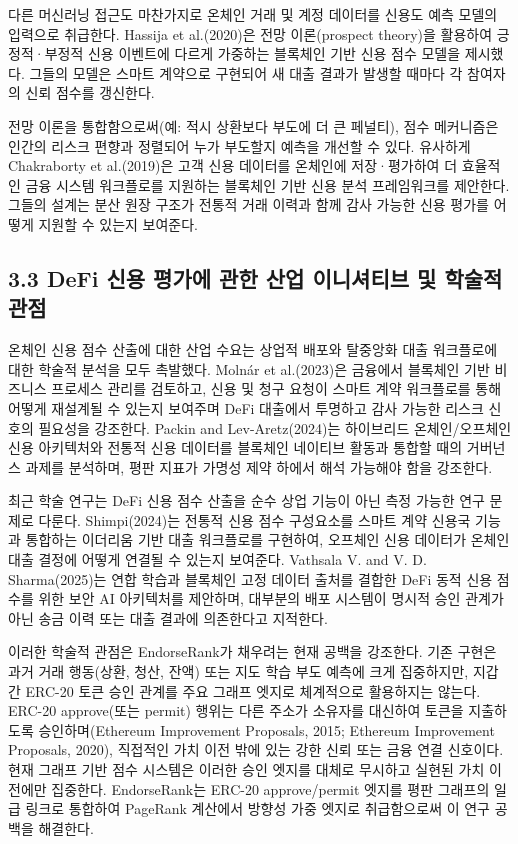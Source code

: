 다른 머신러닝 접근도 마찬가지로 온체인 거래 및 계정 데이터를 신용도 예측 모델의 입력으로 취급한다. Hassija et al.(2020)은 전망 이론(prospect theory)을 활용하여 긍정적·부정적 신용 이벤트에 다르게 가중하는 블록체인 기반 신용 점수 모델을 제시했다. 그들의 모델은 스마트 계약으로 구현되어 새 대출 결과가 발생할 때마다 각 참여자의 신뢰 점수를 갱신한다.


전망 이론을 통합함으로써(예: 적시 상환보다 부도에 더 큰 페널티), 점수 메커니즘은 인간의 리스크 편향과 정렬되어 누가 부도할지 예측을 개선할 수 있다. 유사하게 Chakraborty et al.(2019)은 고객 신용 데이터를 온체인에 저장·평가하여 더 효율적인 금융 시스템 워크플로를 지원하는 블록체인 기반 신용 분석 프레임워크를 제안한다. 그들의 설계는 분산 원장 구조가 전통적 거래 이력과 함께 감사 가능한 신용 평가를 어떻게 지원할 수 있는지 보여준다.


\subsection*{3.3 DeFi 신용 평가에 관한 산업 이니셔티브 및 학술적 관점}
\label{sec:industry-initiatives-and-non-scholarly-perspectives}

온체인 신용 점수 산출에 대한 산업 수요는 상업적 배포와 탈중앙화 대출 워크플로에 대한 학술적 분석을 모두 촉발했다. Moln\'{a}r et al.(2023)은 금융에서 블록체인 기반 비즈니스 프로세스 관리를 검토하고, 신용 및 청구 요청이 스마트 계약 워크플로를 통해 어떻게 재설계될 수 있는지 보여주며 DeFi 대출에서 투명하고 감사 가능한 리스크 신호의 필요성을 강조한다. Packin and Lev-Aretz(2024)는 하이브리드 온체인/오프체인 신용 아키텍처와 전통적 신용 데이터를 블록체인 네이티브 활동과 통합할 때의 거버넌스 과제를 분석하며, 평판 지표가 가명성 제약 하에서 해석 가능해야 함을 강조한다.


최근 학술 연구는 DeFi 신용 점수 산출을 순수 상업 기능이 아닌 측정 가능한 연구 문제로 다룬다. Shimpi(2024)는 전통적 신용 점수 구성요소를 스마트 계약 신용국 기능과 통합하는 이더리움 기반 대출 워크플로를 구현하여, 오프체인 신용 데이터가 온체인 대출 결정에 어떻게 연결될 수 있는지 보여준다. Vathsala V. and V. D. Sharma(2025)는 연합 학습과 블록체인 고정 데이터 출처를 결합한 DeFi 동적 신용 점수를 위한 보안 AI 아키텍처를 제안하며, 대부분의 배포 시스템이 명시적 승인 관계가 아닌 송금 이력 또는 대출 결과에 의존한다고 지적한다.


이러한 학술적 관점은 EndorseRank가 채우려는 현재 공백을 강조한다. 기존 구현은 과거 거래 행동(상환, 청산, 잔액) 또는 지도 학습 부도 예측에 크게 집중하지만, 지갑 간 ERC-20 토큰 승인 관계를 주요 그래프 엣지로 체계적으로 활용하지는 않는다. ERC-20 approve(또는 permit) 행위는 다른 주소가 소유자를 대신하여 토큰을 지출하도록 승인하며(Ethereum Improvement Proposals, 2015; Ethereum Improvement Proposals, 2020), 직접적인 가치 이전 밖에 있는 강한 신뢰 또는 금융 연결 신호이다. 현재 그래프 기반 점수 시스템은 이러한 승인 엣지를 대체로 무시하고 실현된 가치 이전에만 집중한다. EndorseRank는 ERC-20 approve/permit 엣지를 평판 그래프의 일급 링크로 통합하여 PageRank 계산에서 방향성 가중 엣지로 취급함으로써 이 연구 공백을 해결한다.


